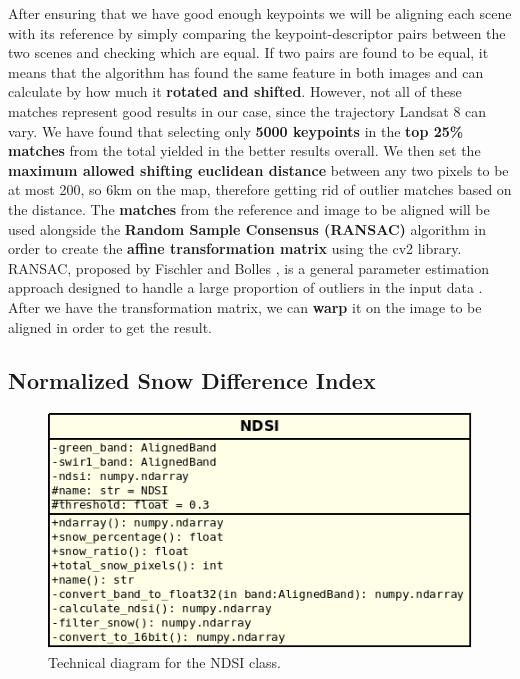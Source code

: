 \documentclass[11pt, a4paper]{report}
\begin{document}
	After ensuring that we have good enough keypoints we will be aligning each scene with its reference by simply comparing the keypoint-descriptor pairs between the two scenes and checking which are equal. If two pairs are found to be equal, it means that the algorithm has found the same feature in both images and can calculate by how much it \textbf{rotated and shifted}. However, not all of these matches represent good results in our case, since the trajectory Landsat 8 can vary. We have found that selecting only \textbf{5000 keypoints} in the \textbf{top 25\% matches} from the total yielded in the better results overall. We then set the \textbf{maximum allowed shifting euclidean distance} between any two pixels to be at most 200, so 6km on the map, therefore getting rid of outlier matches based on the distance.
	The \textbf{matches} from the reference and image to be aligned will be used alongside the \textbf{Random Sample Consensus (RANSAC)} algorithm in order to create the \textbf{affine transformation matrix} using the cv2 library. RANSAC, proposed by Fischler and Bolles \cite{ransac}, is a general parameter estimation approach designed to handle a large proportion of outliers in the input data \cite{ransac2}. After we have the transformation matrix, we can \textbf{warp} it on the image to be aligned in order to get the result. 
	
	\subsection{Normalized Snow Difference Index}
	\label{seq:ndsi_implementation}
	
	\begin{figure}[h!]
		\centering
		\includegraphics[scale=0.6]{../images/ndsi_diagram.png}
		\caption{Technical diagram for the NDSI class.}
		\label{fig:ndsi_diagram}
	\end{figure}
\end{document}
